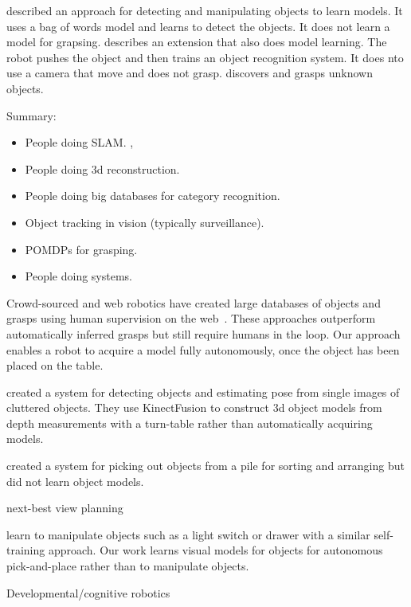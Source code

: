 \documentclass[conference]{IEEEtran}
\begin{document}
\citet{ude12} described an approach for detecting and manipulating
objects to learn models.  It uses a bag of words model and learns to
detect the objects.  It does not learn a model for grapsing.
\citet{schiebener13} describes an extension that also does model
learning.  The robot pushes the object and then trains an object
recognition system.  It does nto use a camera that move and does not
grasp.
\citet{schiebener12} discovers and grasps unknown objects.

Summary: 
\begin{itemize}
\item People doing SLAM.  \citet{wang07, gallagher09}, 
\item People doing 3d reconstruction.   \citet{krainin11, banta00}
\item People doing big databases for category recognition.  \citet{kent14a, kent14, lai11a, goldfeder09}
\item Object tracking in vision (typically surveillance).
\item POMDPs for grasping.  \citet{platt11, hsiao10}
\item People doing systems.  \citet{hudson12, ciocarlie14}
\end{itemize}




Crowd-sourced and web robotics have created large databases of objects
and grasps using human supervision on the web~\citep{kent14a, kent14}.
These approaches outperform automatically inferred grasps but still
require humans in the loop.  Our approach enables a robot to acquire a
model fully autonomously, once the object has been placed on the
table.

\citet{zhu14} created a system for detecting objects and estimating
pose from single images of cluttered objects.  They use KinectFusion
to construct 3d object models from depth measurements with a
turn-table rather than automatically acquiring models.

\citet{chang12} created a system for picking out objects from a pile
for sorting and arranging but did not learn object models.  

next-best view planning~\citep{kriegel11}

\citet{nguyen14} learn to manipulate objects such as a light switch or
drawer with a similar self-training approach.  Our work learns visual
models for objects for autonomous pick-and-place rather than to
manipulate objects.

Developmental/cognitive robotics~\citep{lyubova13, kraft10r}
\end{document}

